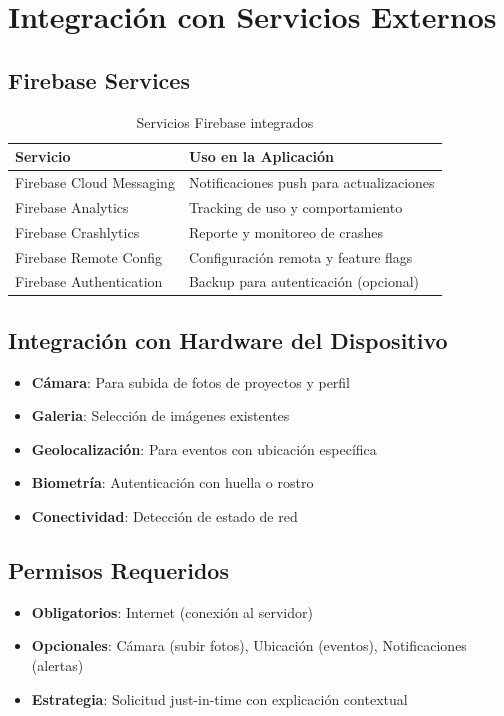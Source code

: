 \documentclass[12pt]{article}
\begin{document}
\section{Integración con Servicios Externos}
\label{sec:integracion}

\subsection{Firebase Services}
\begin{table}[H]
\centering
\begin{tabularx}{\textwidth}{|l|X|}
\hline
\textbf{Servicio} & \textbf{Uso en la Aplicación} \\
\hline
Firebase Cloud Messaging & Notificaciones push para actualizaciones \\
\hline
Firebase Analytics & Tracking de uso y comportamiento \\
\hline
Firebase Crashlytics & Reporte y monitoreo de crashes \\
\hline
Firebase Remote Config & Configuración remota y feature flags \\
\hline
Firebase Authentication & Backup para autenticación (opcional) \\
\hline
\end{tabularx}
\caption{Servicios Firebase integrados}
\end{table}

\subsection{Integración con Hardware del Dispositivo}
\begin{itemize}
    \item \textbf{Cámara}: Para subida de fotos de proyectos y perfil
    \item \textbf{Galeria}: Selección de imágenes existentes
    \item \textbf{Geolocalización}: Para eventos con ubicación específica
    \item \textbf{Biometría}: Autenticación con huella o rostro
    \item \textbf{Conectividad}: Detección de estado de red
\end{itemize}

\subsection{Permisos Requeridos}
\begin{itemize}
    \item \textbf{Obligatorios}: Internet (conexión al servidor)
    \item \textbf{Opcionales}: Cámara (subir fotos), Ubicación (eventos), Notificaciones (alertas)
    \item \textbf{Estrategia}: Solicitud just-in-time con explicación contextual
\end{itemize}
\end{document}
